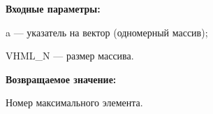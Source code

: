 \textbf{Входные параметры:}

 a --- указатель на вектор (одномерный массив);
 
 VHML\_N --- размер массива.

\textbf{Возвращаемое значение:}

Номер максимального элемента.